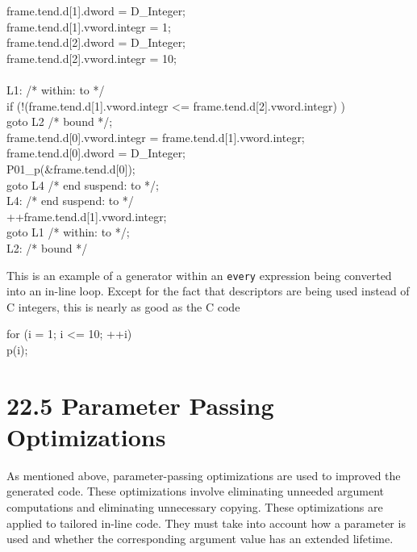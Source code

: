 \goodbreak
\begin{iconcode}
\>\>frame.tend.d[1].dword = D\_Integer;\\
\>\>frame.tend.d[1].vword.integr = 1;\\
\>\>frame.tend.d[2].dword = D\_Integer;\\
\>\>frame.tend.d[2].vword.integr = 10;\\
\\
\>L1: /* within: to */\\
\>\>if (!(frame.tend.d[1].vword.integr <= frame.tend.d[2].vword.integr) )\\
\>\>\>goto L2 /* bound */;\\
\>\>frame.tend.d[0].vword.integr = frame.tend.d[1].vword.integr;\\
\>\>frame.tend.d[0].dword = D\_Integer;\\
\>\>P01\_p(\&frame.tend.d[0]);\\
\>\>goto L4 /* end suspend: to */;\\
\>L4: /* end suspend: to */\\
\>\>++frame.tend.d[1].vword.integr;\\
\>\>goto L1 /* within: to */;\\
\>L2: /* bound */\\
\end{iconcode}


This is an example of a generator within an \texttt{every} expression
being converted into an in-line loop. Except for the fact that
descriptors are being used instead of C integers, this is nearly as
good as the C code

\goodbreak
\begin{iconcode}
\>for (i = 1; i <= 10; ++i)\\
\>\>p(i);\\
\end{iconcode}


\section[22.5 Parameter Passing Optimizations]{22.5 Parameter Passing Optimizations}

As mentioned above, parameter-passing optimizations are used to
improved the generated code. These optimizations involve eliminating
unneeded argument computations and eliminating unnecessary
copying. These optimizations are applied to tailored in-line
code. They must take into account how a parameter is used and whether
the corresponding argument value has an extended lifetime.


